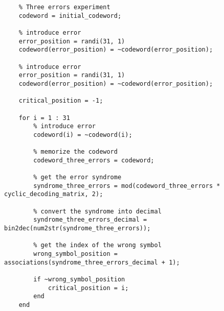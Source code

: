 \begin{lstlisting}
    % Three errors experiment
    codeword = initial_codeword;

    % introduce error
    error_position = randi(31, 1)
    codeword(error_position) = ~codeword(error_position);

    % introduce error
    error_position = randi(31, 1)
    codeword(error_position) = ~codeword(error_position);

    critical_position = -1;

    for i = 1 : 31
        % introduce error
        codeword(i) = ~codeword(i);

        % memorize the codeword
        codeword_three_errors = codeword;

        % get the error syndrome
        syndrome_three_errors = mod(codeword_three_errors * cyclic_decoding_matrix, 2);
        
        % convert the syndrome into decimal
        syndrome_three_errors_decimal = bin2dec(num2str(syndrome_three_errors));
        
        % get the index of the wrong symbol
        wrong_symbol_position = associations(syndrome_three_errors_decimal + 1);
        
        if ~wrong_symbol_position
            critical_position = i;
        end
    end
\end{lstlisting}

